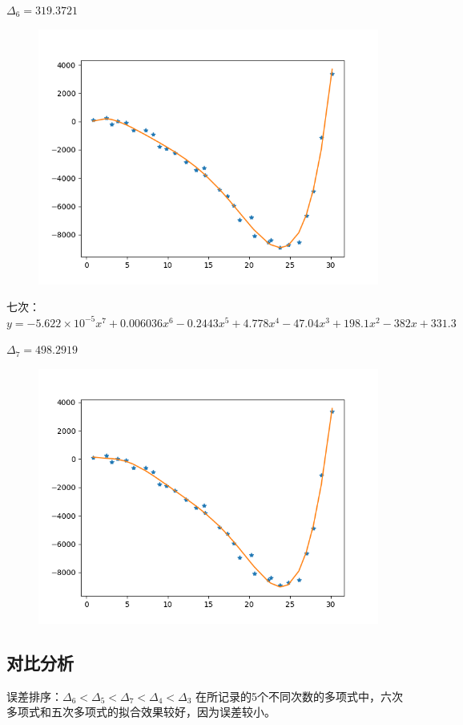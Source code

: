 \documentclass[lang=cn,a4paper]{elegantpaper}
\begin{document}
    $\Delta_6=319.3721$
    \begin{figure}[H]
        \includegraphics[scale=0.4]{1-6.png}
    \end{figure}
    \clearpage
    七次：$y=-5.622\times10^{-5}x^7+0.006036x^6-0.2443x^5+4.778x^4-47.04x^3+198.1x^2-382x+331.3$

    $\Delta_7=498.2919$
    \begin{figure}[H]
        \includegraphics[scale=0.4]{1-7.png}
    \end{figure}
    \subsection{对比分析}
    误差排序：$\Delta_6<\Delta_5<\Delta_7<\Delta_4<\Delta_3$
    在所记录的5个不同次数的多项式中，六次多项式和五次多项式的拟合效果较好，因为误差较小。
\end{document}
